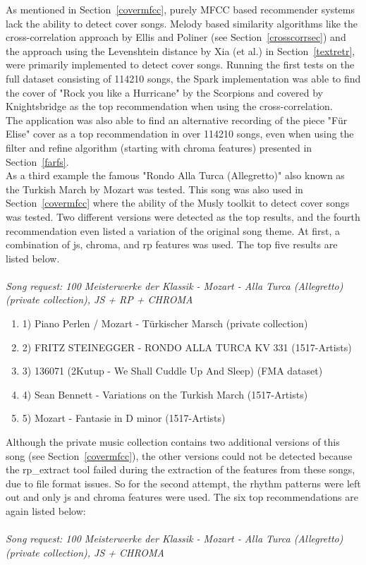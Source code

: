 As mentioned in Section~\ref{covermfcc}, purely MFCC based recommender systems lack the ability to detect cover songs. Melody based similarity algorithms like the cross-correlation approach by Ellis and Poliner (see Section~\ref{crosscorrsec}) and the approach using the Levenshtein distance by Xia (et al.) in Section~\ref{textretr}, were primarily implemented to detect cover songs. 
\noindent Running the first tests on the full dataset consisting of 114210 songs, the Spark implementation was able to find the cover of "Rock you like a Hurricane" by the Scorpions and covered by Knightsbridge as the top recommendation when using the cross-correlation.\\
\noindent The application was also able to find an alternative recording of the piece "Für Elise" cover as a top recommendation in over 114210 songs, even when using the filter and refine algorithm (starting with chroma features) presented in Section~\ref{farfs}.\\
\noindent As a third example the famous "Rondo Alla Turca (Allegretto)" also known as the Turkish March by Mozart was tested. This song was also used in Section~\ref{covermfcc} where the ability of the Musly toolkit to detect cover songs was tested. \noindent Two different versions were detected as the top results, and the fourth recommendation even listed a variation of the original song theme. 
At first, a combination of js, chroma, and rp features was used. The top five results are listed below.\\
\ \\
\textit{\noindent Song request: 100 Meisterwerke der Klassik - Mozart - Alla Turca (Allegretto) (private collection), JS + RP + CHROMA}

\begin{enumerate}
	\setlength\itemsep{-0.5em}
	\item 1) Piano Perlen / Mozart - Türkischer Marsch (private collection)
	\item 2) FRITZ STEINEGGER - RONDO ALLA TURCA KV 331 (1517-Artists)
	\item 3) 136071 (2Kutup - We Shall Cuddle Up And Sleep) (FMA dataset)
	\item 4) Sean Bennett - Variations on the Turkish March (1517-Artists)
	\item 5) Mozart - Fantasie in D minor (1517-Artists)
\end{enumerate}

\noindent Although the private music collection contains two additional versions of this song (see Section~\ref{covermfcc}), the other versions could not be detected because the rp\_extract tool failed during the extraction of the features from these songs, due to file format issues. So for the second attempt, the rhythm patterns were left out and only js and chroma features were used. The six top recommendations are again listed below:\\
\ \\
\textit{\noindent Song request: 100 Meisterwerke der Klassik - Mozart - Alla Turca (Allegretto) (private collection), JS + CHROMA}

